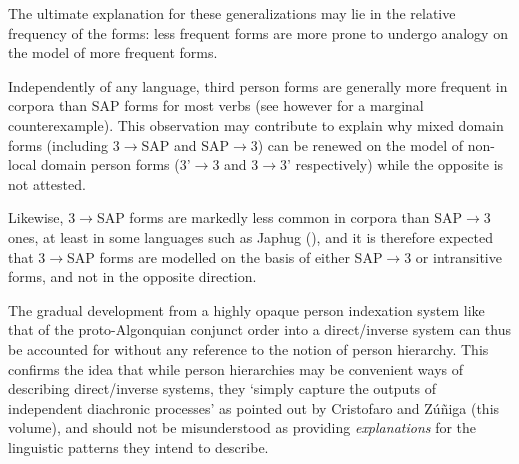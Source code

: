 \documentclass[twoside,a4paper,11pt]{article}
\begin{document}
The ultimate explanation for these generalizations may lie in the relative frequency of the forms: less frequent forms are more prone to undergo analogy on the model of more frequent forms. 

Independently of any language, third person forms are generally more frequent in corpora than SAP forms for most verbs (see however \citealt{jacques16ebde} for a marginal counterexample).  This observation may contribute to explain why mixed domain forms (including 3$\rightarrow$SAP and SAP$\rightarrow$3) can be renewed on the model of non-local domain person forms (3'$\rightarrow$3 and 3$\rightarrow$3' respectively) while the opposite is not attested.
 
Likewise, 3$\rightarrow$SAP forms are markedly less common in corpora than SAP$\rightarrow$3 ones, at least in some languages such as Japhug (\citealt{jacques10inverse}), and it is therefore expected that 3$\rightarrow$SAP forms are modelled on the basis of either SAP$\rightarrow$3 or intransitive forms, and not in the opposite direction.

 The gradual development from a highly opaque person indexation system like that of the proto-Algonquian conjunct order into a direct/inverse system can thus be accounted for without any reference to the notion of person hierarchy. This confirms the idea that while person hierarchies may be convenient ways of describing direct/inverse systems, they `simply capture the outputs of independent diachronic processes' as pointed out by Cristofaro and Zúñiga (this volume), and should not be misunderstood as providing \textit{explanations} for the linguistic patterns they intend to describe.

 
 
\end{document}
